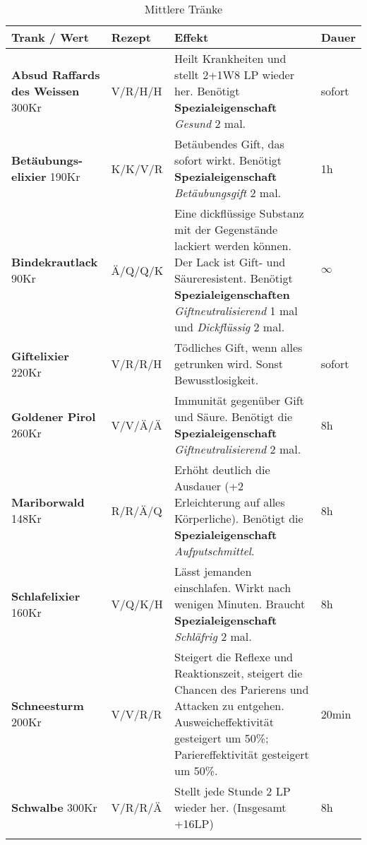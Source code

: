 \begin{longtable}{|p{3cm}|p{}|p{8cm}|p{}|}
\hline
\textbf{Trank} / Wert & \textbf{Rezept} & \textbf{Effekt} & \textbf{Dauer} \\ \hline

\textbf{Absud Raffards des Weissen} \newline 300Kr & V/R/H/H & Heilt Krankheiten und stellt 2+1W8 LP wieder her. Benötigt \textbf{Spezialeigenschaft} \textit{Gesund} 2 mal. & sofort \\ \hline

\textbf{Betäubungs- elixier} \newline 190Kr & K/K/V/R & Betäubendes Gift, das sofort wirkt. Benötigt \textbf{Spezialeigenschaft} \textit{Betäubungsgift} 2 mal. & 1h \\ \hline

\textbf{Bindekrautlack} \newline 90Kr & Ä/Q/Q/K & Eine dickflüssige Substanz mit der Gegenstände lackiert werden können. Der Lack ist Gift- und Säureresistent. Benötigt \textbf{Spezialeigenschaften} \textit{Giftneutralisierend} 1 mal und \textit{Dickflüssig} 2 mal. & $\infty$ \\ \hline

\textbf{Giftelixier} \newline 220Kr & V/R/R/H & Tödliches Gift, wenn alles getrunken wird. Sonst Bewusstlosigkeit. & sofort \\ \hline

\textbf{Goldener Pirol} \newline 260Kr & V/V/Ä/Ä & Immunität gegenüber Gift und Säure. Benötigt die \textbf{Spezialeigenschaft} \textit{Giftneutralisierend} 2 mal. & 8h \\ \hline

\textbf{Mariborwald} \newline 148Kr & R/R/Ä/Q & Erhöht deutlich die Ausdauer (+2 Erleichterung auf alles Körperliche). Benötigt die \textbf{Spezialeigenschaft} \textit{Aufputschmittel}. & 8h \\ \hline

\textbf{Schlafelixier} \newline 160Kr & V/Q/K/H & Lässt jemanden einschlafen. Wirkt nach wenigen Minuten. Braucht \textbf{Spezialeigenschaft} \textit{Schläfrig} 2 mal. & 8h \\ \hline

\textbf{Schneesturm} \newline 200Kr & V/V/R/R & Steigert die Reflexe und Reaktionszeit, steigert die Chancen des Parierens und Attacken zu entgehen. Ausweicheffektivität gesteigert um 50\%; Pariereffektivität gesteigert um 50\%. & 20min \\ \hline

\textbf{Schwalbe} \newline 300Kr & V/R/R/Ä & Stellt jede Stunde 2 LP wieder her. (Insgesamt +16LP) & 8h \\ \hline

\caption{Mittlere Tränke}
\label{tab:mittlere_traenke}
\end{longtable}

